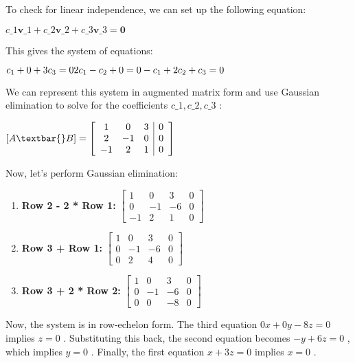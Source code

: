 \documentclass[11pt]{article}
\begin{document}
To check for linear independence, we can set up the following equation:

$  c\_1 \mathbf{v}\_1 + c\_2 \mathbf{v}\_2 + c\_3 \mathbf{v}\_3 =
\mathbf{0} $ 

This gives the system of equations:

$
c_1 + 0 + 3c_3 = 0 \\
2c_1 - c_2 + 0 = 0 \\
-c_1 + 2c_2 + c_3 = 0
$

We can represent this system in augmented matrix form and use Gaussian
elimination to solve for the coefficients $  c\_1, c\_2, c\_3$  :

$  {[}A \textbar{} B{]} = \left[ \begin{array}{ccc|c}
1 & 0 & 3 & 0 \\
2 & -1 & 0 & 0 \\
-1 & 2 & 1 & 0
\end{array} \right]$ 

Now, let's perform Gaussian elimination:

\begin{enumerate}
\def\labelenumi{\arabic{enumi}.}
\item
  \textbf{Row 2 - 2 * Row 1:} $  \left[ \begin{array}{ccc|c}
  1 & 0 & 3 & 0 \\
  0 & -1 & -6 & 0 \\
  -1 & 2 & 1 & 0
  \end{array} \right]$ 
\item
  \textbf{Row 3 + Row 1:} $  \left[ \begin{array}{ccc|c}
  1 & 0 & 3 & 0 \\
  0 & -1 & -6 & 0 \\
  0 & 2 & 4 & 0
  \end{array} \right]$ 
\item
  \textbf{Row 3 + 2 * Row 2:} $  \left[ \begin{array}{ccc|c}
  1 & 0 & 3 & 0 \\
  0 & -1 & -6 & 0 \\
  0 & 0 & -8 & 0
  \end{array} \right]$ 
\end{enumerate}

Now, the system is in row-echelon form. The third equation $  0x + 0y -
8z = 0$  implies $  z = 0$  . Substituting this back, the second
equation becomes $  -y + 6z = 0$  , which implies $  y = 0$  . Finally,
the first equation $  x + 3z = 0$  implies $  x = 0$  .
\end{document}
